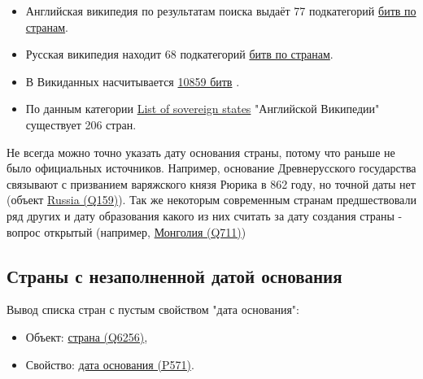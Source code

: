 
\begin{itemize}
    \item Английская википедия по результатам поиска выдаёт 77 подкатегорий \href{https://commons.wikimedia.org/wiki/Category:Battles_by_country}{битв по странам}.
    \item Русская википедия находит 68 подкатегорий \href{https://ru.wikipedia.org/wiki/%D0%9A%D0%B0%D1%82%D0%B5%D0%B3%D0%BE%D1%80%D0%B8%D1%8F:%D0%A1%D1%80%D0%B0%D0%B6%D0%B5%D0%BD%D0%B8%D1%8F_%D0%BF%D0%BE_%D1%81%D1%82%D1%80%D0%B0%D0%BD%D0%B0%D0%BC}{битв по странам}.

    \item В Викиданных насчитывается \href{https://query.wikidata.org/#%23added%202017-02%0A%23List%20of%20%60instances%20of%60%20%22national%20park%22%20%0ASELECT%20%3Fbattle%20%3FbattleLabel%0AWHERE%0A%7B%0A%20%20%20%20%3Fbattle%20wdt%3AP31%20wd%3AQ178561.%0A%20%20%20%20SERVICE%20wikibase%3Alabel%20%7B%20bd%3AserviceParam%20wikibase%3Alanguage%20%22en%22%20%7D%0A%7D}{10859 битв} .

    \item По данным категории \href{https://www.wikipedia.org/wiki/en:List_of_sovereign_states}{List of sovereign states} "Английской Википедии" существует 206 стран.
    \end{itemize}

Не всегда можно точно указать дату основания страны, потому что раньше не было официальных источников. Например, основание Древнерусского государства связывают с призванием варяжского князя Рюрика в 862 году, но точной даты нет (объект \href{https://www.wikidata.org/wiki/Q159} {Russia (Q159)}). Так же некоторым современным странам предшествовали ряд других и дату образования какого из них считать за дату создания страны - вопрос открытый (например, \href{https://www.wikidata.org/wiki/Q711}{Монголия (Q711)})


\subsection{Страны с незаполненной датой основания}

Вывод списка стран с пустым свойством "дата основания":

\begin{itemize}
    \item Объект: \href{https://www.wikidata.org/wiki/Q6256}{страна (Q6256)},
    \item Свойство: \href{https://www.wikidata.org/wiki/Property:P571}{дата основания (P571)}.
\end{itemize}


